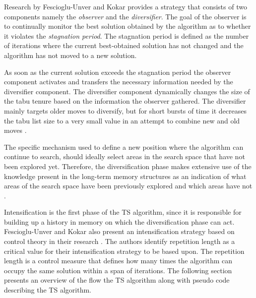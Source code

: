 Research by Fescioglu-Unver and Kokar \cite{SelfControllingReactiveTabu} provides a strategy that consists of two components namely the \emph{observer} and the \emph{diversifier}. The goal of the observer is to continually monitor the best solution obtained by the algorithm as to whether it violates the \emph{stagnation period}. The stagnation period is defined as the number of iterations where the current best-obtained solution has not changed and the algorithm has not moved to a new solution\cite{SelfControllingReactiveTabu}. 

As soon as the current solution exceeds the stagnation period the observer component activates and transfers the necessary information needed by the diversifier component. The diversifier component dynamically changes the size of the tabu tenure based on the information the observer gathered. The diversifier mainly targets older moves to diversify, but for short bursts of time it decreases the tabu list size to a very small value in an attempt to combine new and old moves \cite{SelfControllingReactiveTabu}.

The specific mechanism used to define a new position where the algorithm can continue to search, should ideally select areas in the search space that have not been explored yet\cite{NonlinearGlobalTabu,SelfControllingReactiveTabu}. Therefore, the diversification phase makes extensive use of the knowledge present in the long-term memory structures as an indication of what areas of the search space have been previously explored and which areas have not \cite{NonlinearGlobalTabu,SelfControllingReactiveTabu}.

Intensification is the first phase of the \gls{TS} algorithm, since it is responsible for building up a history in memory on which the diversification phase can act. Fescioglu-Unver and Kokar also present an intensification strategy based on control theory in their research \cite{SelfControllingReactiveTabu}. The authors identify repetition length as a critical value for their intensification strategy to be based upon. The repetition length is a control measure that defines how many times the algorithm can occupy the same solution within a span of iterations. The following section presents an overview of the flow the \gls{TS} algorithm along with pseudo code describing the \gls{TS} algorithm.

